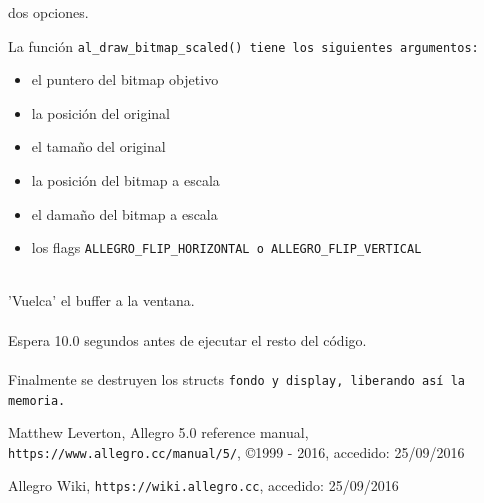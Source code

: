 \documentclass[11pt]{article}
\begin{document}
dos opciones.

La función \tt al\_draw\_bitmap\_scaled() \rm tiene los siguientes argumentos:
\begin{itemize}
\item el puntero del bitmap objetivo
\item la posición del original
\item el tamaño del original
\item la posición del bitmap a escala
\item el damaño del bitmap a escala
\item los flags \tt ALLEGRO\_FLIP\_HORIZONTAL\rm \ o \tt ALLEGRO\_FLIP\_VERTICAL\rm
\end{itemize}


\\

'Vuelca' el buffer a la ventana.\\

\\

Espera 10.0 segundos antes de ejecutar el resto del código.\\

\\

Finalmente se destruyen los structs \tt fondo \rm y \tt display\rm , liberando así la memoria.
\vfill
\begin{thebibliography}{9}
     Matthew Leverton, 
     Allegro 5.0 reference manual, 
     \verb!https://www.allegro.cc/manual/5/!, 
     \copyright 1999 - 2016,
     accedido: 25/09/2016
     
     Allegro Wiki,
     \verb!https://wiki.allegro.cc!,
     accedido: 25/09/2016
\end{thebibliography}
\end{document}
